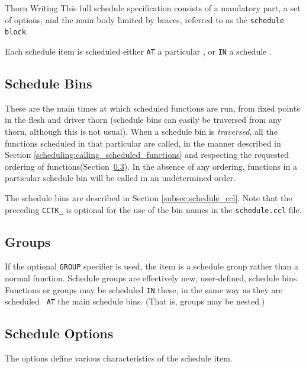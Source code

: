 \begin{cactuspart}{Thorn Writing}
This full schedule specification consists of a mandatory part, a set
of options, and the main body limited by braces, referred to as the
\texttt{schedule block}.

Each schedule item is scheduled either \texttt{AT} a particular
, or \texttt{IN} a schedule .


\subsection{Schedule Bins}
\label{scheduling:schedule_bins}

These are the main times at which scheduled functions are run, from
fixed points in the flesh and driver thorn (schedule bins can easily
be traversed from any thorn, although this is not usual).  When a
schedule bin is \textit{traversed}, all the functions scheduled in that
particular are called, in the manner described in Section
\ref{scheduling:calling_scheduled_functions} and respecting the
requested ordering of functions(Section~\ref{scheduling:schedule_options}). In the absence of any ordering, functions in a particular schedule bin will be called in
an undetermined order.

The schedule bins are described in Section \ref{subsec:schedule_ccl}. Note that
the preceding \texttt{CCTK\_} is optional for the use of the bin names
in the \texttt{schedule.ccl} file.


\subsection{Groups}
\label{scheduling:groups}

If the optional \texttt{GROUP} specifier is used, the item is a schedule
group rather than a normal function.  Schedule groups are effectively
new, user-defined, schedule bins.  Functions or groups may be
scheduled \texttt{IN} these, in the same way as they are scheduled {\tt
AT} the main schedule bins.  (That is, groups may be nested.)


\subsection{Schedule Options}
\label{scheduling:schedule_options}
The options define various characteristics of the schedule item.


\end{cactuspart}
